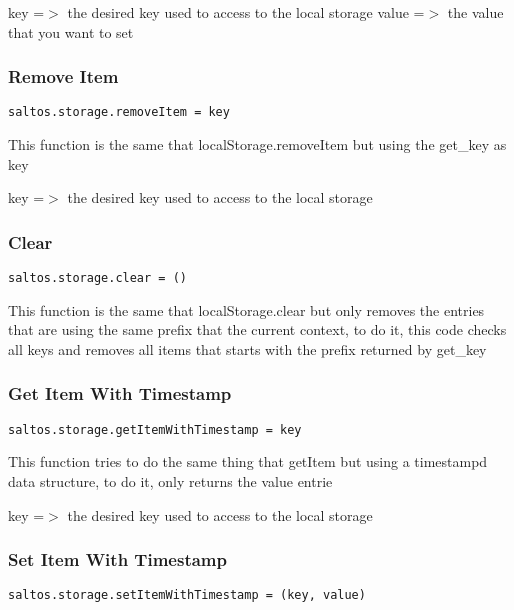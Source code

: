 \documentclass[a4paper]{article}
\begin{document}
key   =$>$ the desired key used to access to the local storage
value =$>$ the value that you want to set

\hypertarget{toc850}{}
\subsubsection{Remove Item}

\begin{lstlisting}
saltos.storage.removeItem = key
\end{lstlisting}

This function is the same that localStorage.removeItem but using the get\_key as key

key =$>$ the desired key used to access to the local storage

\hypertarget{toc851}{}
\subsubsection{Clear}

\begin{lstlisting}
saltos.storage.clear = ()
\end{lstlisting}

This function is the same that localStorage.clear but only removes the entries that
are using the same prefix that the current context, to do it, this code checks all
keys and removes all items that starts with the prefix returned by get\_key

\hypertarget{toc852}{}
\subsubsection{Get Item With Timestamp}

\begin{lstlisting}
saltos.storage.getItemWithTimestamp = key
\end{lstlisting}

This function tries to do the same thing that getItem but using a timestampd data
structure, to do it, only returns the value entrie

key =$>$ the desired key used to access to the local storage

\hypertarget{toc853}{}
\subsubsection{Set Item With Timestamp}

\begin{lstlisting}
saltos.storage.setItemWithTimestamp = (key, value)
\end{lstlisting}
\end{document}
